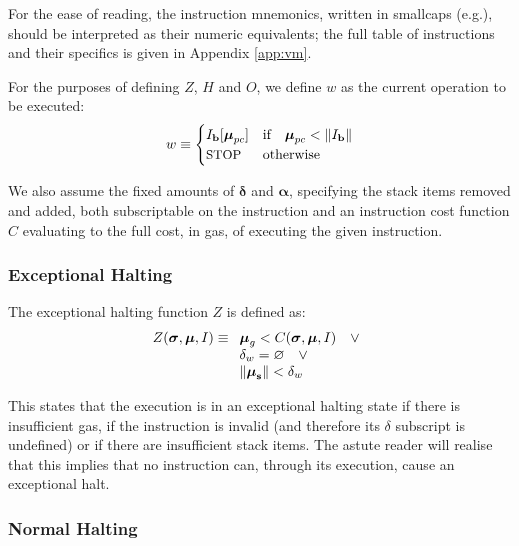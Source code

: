 \documentclass[9pt,oneside]{amsart}
\makeatletter
\newcommand*\eg{e.g.\@\xspace}
\makeatother
\begin{document}
\begin{multicols}{2}
For the ease of reading, the instruction mnemonics, written in smallcaps (\eg {}), should be interpreted as their numeric equivalents; the full table of instructions and their specifics is given in Appendix \ref{app:vm}.

For the purposes of defining $Z$, $H$ and $O$, we define $w$ as the current operation to be executed:
\begin{equation}\label{eq:currentoperation}
w \equiv \begin{cases} I_\mathbf{b}[\boldsymbol{\mu}_{pc}] & \text{if} \quad \boldsymbol{\mu}_{pc} < \lVert I_\mathbf{b} \rVert \\
\text{\small STOP} & \text{otherwise}
\end{cases}
\end{equation}

We also assume the fixed amounts of $\mathbf{\delta}$ and $\mathbf{\alpha}$, specifying the stack items removed and added, both subscriptable on the instruction and an instruction cost function $C$ evaluating to the full cost, in gas, of executing the given instruction.

\subsubsection{Exceptional Halting}

The exceptional halting function $Z$ is defined as:
\begin{equation}
Z(\boldsymbol{\sigma}, \boldsymbol{\mu}, I) \equiv
\begin{array}[t]{l}
\boldsymbol{\mu}_g < C(\boldsymbol{\sigma}, \boldsymbol{\mu}, I) \quad \vee \\
\mathbf{\delta}_w = \varnothing \quad \vee \\
\lVert\boldsymbol{\mu}_\mathbf{s}\rVert < \mathbf{\delta}_w
\end{array}
\end{equation}

This states that the execution is in an exceptional halting state if there is insufficient gas, if the instruction is invalid (and therefore its $\delta$ subscript is undefined) or if there are insufficient stack items. The astute reader will realise that this implies that no instruction can, through its execution, cause an exceptional halt.

\subsubsection{Normal Halting}


\end{multicols}
\end{document}

